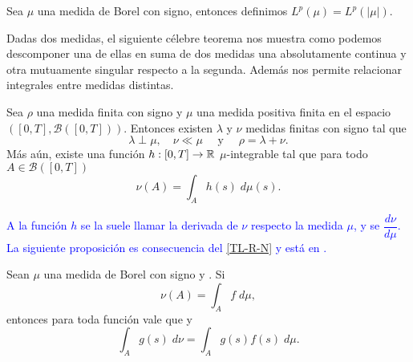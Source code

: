\begin{defi}
	Sea $\mu$ una medida de Borel con signo, entonces definimos $L^p(\mu)=L^p(|\mu|)$.   
\end{defi}

{\color{green}
Dadas dos medidas, el siguiente célebre teorema nos muestra  como podemos descomponer una de ellas en suma de dos medidas una absolutamente continua y otra mutuamente singular respecto a la segunda. Además  nos permite relacionar integrales entre medidas distintas. 
}


\begin{thm}\label{TL-R-N}
	Sea $\rho$ una medida finita con signo y $\mu$ una medida positiva finita en el espacio $\left( [0,T], \mathscr{B}([0,T])\right) $. Entonces existen $\lambda$ y $\nu$ medidas finitas con signo tal que 
	\begin{equation*}
		\lambda\perp\mu, \quad \nu\ll\mu  \quad \text{ y }\quad \rho=\lambda+\nu.
	\end{equation*}
Más aún, existe una función $h:[0,T]\to\mathbb{R}$ $\mu$-integrable tal que para todo $A\in \mathscr{B}([0,T])$
\begin{equation*}
	\nu(A)=\int_A h(s)\;d\mu(s).
\end{equation*}
\end{thm}
\textcolor{blue}{A la función $h$ se la suele llamar la derivada  de  $\nu$ respecto  la medida $\mu$, y se   $\dfrac{d\nu}{d\mu}$.
\normalmarginpar{}La siguiente proposición es consecuencia del  \ref{TL-R-N} y está  en \cite[Proposición 3.9]{folland}.}




\begin{prop}
    \label{ob1}
	Sean $\mu$ una medida de Borel con signo  y  . Si   $$\nu(A)=\int_A f\; d\mu,$$ entonces  para toda función  vale que  y 
	\begin{equation*}
	    \int_A g(s)\;d\nu=\int_Ag(s)f(s)\;d\mu.
	\end{equation*}

\end{prop}


